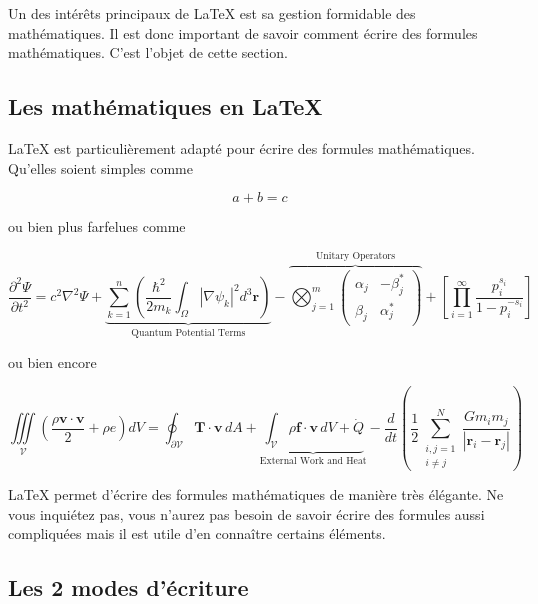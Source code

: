 Un des intérêts principaux de LaTeX est sa gestion
formidable des mathématiques.
Il est donc important de savoir comment écrire des formules mathématiques.
C'est l'objet de cette section.

\subsection{Les mathématiques en LaTeX}\label{subsec:latex_math}

LaTeX est particulièrement adapté pour écrire des formules mathématiques.
Qu'elles soient simples comme

\begin{equation}
    a + b = c
\end{equation}

ou bien plus farfelues comme

\begin{equation}\label{eq:2}
\boxed{
\frac{\partial^2 \Psi}{\partial t^2} = c^2 \nabla^2 \Psi + \underbrace{\sum_{k=1}^n \left( \frac{\hbar^2}{2m_k} \int_{\Omega} |\nabla \psi_k|^2 d^3\mathbf{r} \right)}_{\text{Quantum Potential Terms}} - \overbrace{\bigotimes_{j=1}^m \begin{pmatrix}
\alpha_j & -\beta_j^* \\
\beta_j & \alpha_j^*
\end{pmatrix}}^{\text{Unitary Operators}} + \left[ \prod_{i=1}^\infty \frac{p_i^{s_i}}{1-p_i^{-s_i}} \right]
}
\end{equation}

ou bien encore

\begin{equation}\label{eq:3}
\iiint\limits_{\mathcal{V}} \left( \frac{\rho\mathbf{v} \cdot \mathbf{v}}{2} + \rho e \right) dV = \oint_{\partial \mathcal{V}} \mathbf{T} \cdot \mathbf{v} \, dA + \underbrace{\int_{\mathcal{V}} \rho \mathbf{f} \cdot \mathbf{v} \, dV + \dot{Q}}_{\text{External Work and Heat}} - \frac{d}{dt} \left( \frac{1}{2} \sum_{\substack{i,j=1 \\ i\neq j}}^{N} \frac{G m_i m_j}{|\mathbf{r}_i - \mathbf{r}_j|} \right)
\end{equation}

LaTeX permet d'écrire des formules mathématiques de manière très élégante.
Ne vous inquiétez pas, vous n'aurez pas besoin de savoir écrire des formules aussi compliquées
mais il est utile d'en connaître certains éléments.

\subsection{Les 2 modes d'écriture}\label{subsec:latex_math_modes}


